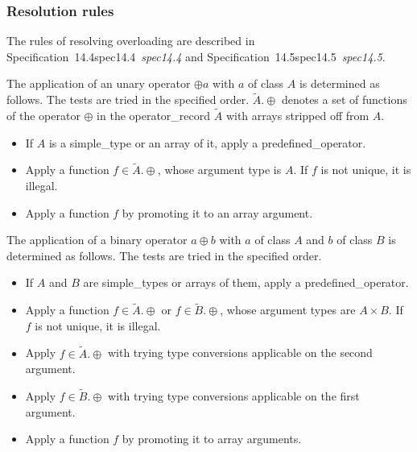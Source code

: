 \documentclass[10pt,b5paper]{article}
\def\specrefx#1#2{Specification~#1\ifx\relax#2\relax{}\else~{\it{}#2}\fi}
\def\specref#1{\specrefx{#1}{\csname spec#1\endcsname}}
\begin{document}
\subsubsection*{Resolution rules}

The rules of resolving overloading are described in \specref{14.4}\/
and \specref{14.5}.

The application of an unary operator $\oplus a$ with $a$ of class $A$
is determined as follows.  The tests are tried in the specified order.
$\tilde{A}.\oplus$ denotes a set of functions of the operator $\oplus$
in the operator_record $\tilde{A}$ with arrays stripped off from $A$.

\begin{itemize}

\item If $A$ is a simple_type or an array of it, apply a
predefined_operator.

\item Apply a function $f \in \tilde{A}.\oplus$, whose argument type
is $A$.  If $f$ is not unique, it is illegal.

\item Apply a function $f$ by promoting it to an array argument.

\end{itemize}

The application of a binary operator $a \oplus b$ with $a$ of class
$A$ and $b$ of class $B$ is determined as follows.  The tests are
tried in the specified order.

\begin{itemize}

\item If $A$ and $B$ are simple_types or arrays of them, apply a
predefined_operator.

\item Apply a function $f \in \tilde{A}.\oplus$ or $f \in
\tilde{B}.\oplus$, whose argument types are $A\times B$.  If $f$ is
not unique, it is illegal.

\item Apply $f \in \tilde{A}.\oplus$ with trying type conversions applicable on
the second argument.

\item Apply $f \in \tilde{B}.\oplus$ with trying type conversions
applicable on the first argument.

\item Apply a function $f$ by promoting it to array arguments.

\end{itemize}
\end{document}
